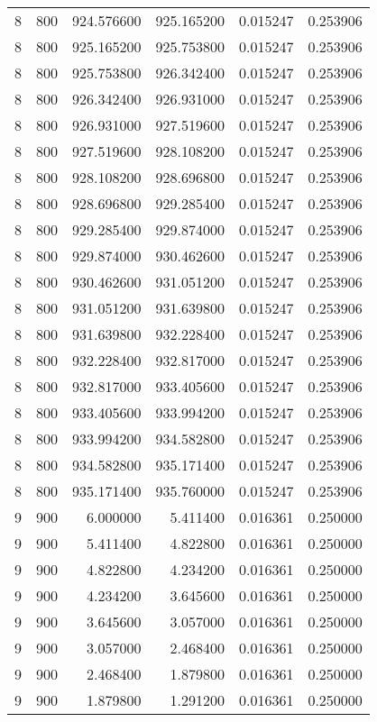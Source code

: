 \begin{longtable}{rrrrrr}
8 & 800 & 924.576600 & 925.165200 & 0.015247 & 0.253906 \\
8 & 800 & 925.165200 & 925.753800 & 0.015247 & 0.253906 \\
8 & 800 & 925.753800 & 926.342400 & 0.015247 & 0.253906 \\
8 & 800 & 926.342400 & 926.931000 & 0.015247 & 0.253906 \\
8 & 800 & 926.931000 & 927.519600 & 0.015247 & 0.253906 \\
8 & 800 & 927.519600 & 928.108200 & 0.015247 & 0.253906 \\
8 & 800 & 928.108200 & 928.696800 & 0.015247 & 0.253906 \\
8 & 800 & 928.696800 & 929.285400 & 0.015247 & 0.253906 \\
8 & 800 & 929.285400 & 929.874000 & 0.015247 & 0.253906 \\
8 & 800 & 929.874000 & 930.462600 & 0.015247 & 0.253906 \\
8 & 800 & 930.462600 & 931.051200 & 0.015247 & 0.253906 \\
8 & 800 & 931.051200 & 931.639800 & 0.015247 & 0.253906 \\
8 & 800 & 931.639800 & 932.228400 & 0.015247 & 0.253906 \\
8 & 800 & 932.228400 & 932.817000 & 0.015247 & 0.253906 \\
8 & 800 & 932.817000 & 933.405600 & 0.015247 & 0.253906 \\
8 & 800 & 933.405600 & 933.994200 & 0.015247 & 0.253906 \\
8 & 800 & 933.994200 & 934.582800 & 0.015247 & 0.253906 \\
8 & 800 & 934.582800 & 935.171400 & 0.015247 & 0.253906 \\
8 & 800 & 935.171400 & 935.760000 & 0.015247 & 0.253906 \\
9 & 900 & 6.000000 & 5.411400 & 0.016361 & 0.250000 \\
9 & 900 & 5.411400 & 4.822800 & 0.016361 & 0.250000 \\
9 & 900 & 4.822800 & 4.234200 & 0.016361 & 0.250000 \\
9 & 900 & 4.234200 & 3.645600 & 0.016361 & 0.250000 \\
9 & 900 & 3.645600 & 3.057000 & 0.016361 & 0.250000 \\
9 & 900 & 3.057000 & 2.468400 & 0.016361 & 0.250000 \\
9 & 900 & 2.468400 & 1.879800 & 0.016361 & 0.250000 \\
9 & 900 & 1.879800 & 1.291200 & 0.016361 & 0.250000 \\

\end{longtable}
